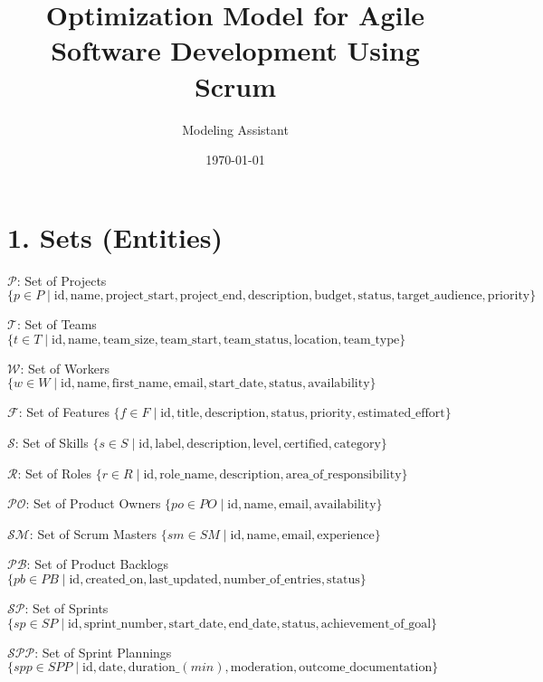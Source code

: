 \documentclass[12pt]{article}
\title{Optimization Model for Agile Software Development Using Scrum}
\author{Modeling Assistant}
\date{\today}
\begin{document}
\maketitle

\tableofcontents
\newpage

\section{1. Sets (Entities)}
\item $ \mathcal{P} $: Set of Projects $ \{ p \in P \mid \text{id}, \text{name}, \text{project\_start}, \text{project\_end}, \text{description}, \text{budget}, \text{status}, \text{target\_audience}, \text{priority} \} $
    \item $ \mathcal{T} $: Set of Teams $ \{ t \in T \mid \text{id}, \text{name}, \text{team\_size}, \text{team\_start}, \text{team\_status}, \text{location}, \text{team\_type} \} $
    \item $ \mathcal{W} $: Set of Workers $ \{ w \in W \mid \text{id}, \text{name}, \text{first\_name}, \text{email}, \text{start\_date}, \text{status}, \text{availability} \} $
    \item $ \mathcal{F} $: Set of Features $ \{ f \in F \mid \text{id}, \text{title}, \text{description}, \text{status}, \text{priority}, \text{estimated\_effort} \} $
    \item $ \mathcal{S} $: Set of Skills $ \{ s \in S \mid \text{id}, \text{label}, \text{description}, \text{level}, \text{certified}, \text{category} \} $
    \item $ \mathcal{R} $: Set of Roles $ \{ r \in R \mid \text{id}, \text{role\_name}, \text{description}, \text{area\_of\_responsibility} \} $
    \item $ \mathcal{PO} $: Set of Product Owners $ \{ po \in PO \mid \text{id}, \text{name}, \text{email}, \text{availability} \} $
    \item $ \mathcal{SM} $: Set of Scrum Masters $ \{ sm \in SM \mid \text{id}, \text{name}, \text{email}, \text{experience} \} $
    \item $ \mathcal{PB} $: Set of Product Backlogs $ \{ pb \in PB \mid \text{id}, \text{created\_on}, \text{last\_updated}, \text{number\_of\_entries}, \text{status} \} $
    \item $ \mathcal{SP} $: Set of Sprints $ \{ sp \in SP \mid \text{id}, \text{sprint\_number}, \text{start\_date}, \text{end\_date}, \text{status}, \text{achievement\_of\_goal} \} $
    \item $ \mathcal{SPP} $: Set of Sprint Plannings $ \{ spp \in SPP \mid \text{id}, \text{date}, \text{duration\_}(min), \text{moderation}, \text{outcome\_documentation} \} $
\end{document}
